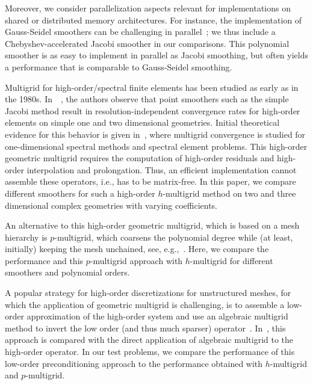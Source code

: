 \documentclass[smallcondensed,final]{svjour3}     %
\begin{document}
Moreover, we consider parallelization aspects relevant for
implementations on shared or distributed memory architectures. For
instance, the implementation of Gauss-Seidel smoothers can be
challenging in parallel~\cite{AdamsBrezinaHuEtAl03,
  BakerFalgoutKolevEtAl11}; we thus include a Chebyshev-accelerated
Jacobi smoother in our comparisons. This polynomial smoother is as
easy to implement in parallel as Jacobi smoothing, but often yields a
performance that is comparable to Gauss-Seidel smoothing.


Multigrid for high-order/spectral finite elements has been studied as
early as in the 1980s. In~~\cite{RonquistPatera87}, the authors
observe that point smoothers such as the simple Jacobi method result
in resolution-independent convergence rates for high-order elements on
simple one and two dimensional geometries. Initial theoretical
evidence for this behavior is given in~\cite{MadayMunoz88}, where
multigrid convergence is studied for one-dimensional spectral methods
and spectral element problems. This high-order geometric multigrid
requires the computation of high-order residuals and high-order
interpolation and prolongation. Thus, an efficient implementation
cannot assemble these operators, i.e., has to be matrix-free.  In this
paper, we compare different smoothers for such a high-order
$h$-multigrid method on two and three dimensional complex geometries
with varying coefficients.

An alternative to this high-order geometric multigrid, which is based
on a mesh hierarchy is $p$-multigrid, which coarsens the polynomial
degree while (at least, initially) keeping the mesh unchained, see,
e.g.,~\cite{HelenbrookMavriplisAtkins03}. Here, we compare the
performance and this $p$-multigrid approach with $h$-multigrid for
different smoothers and polynomial orders.


A popular strategy for high-order discretizations for unstructured
meshes, for which the application of geometric multigrid is
challenging, is to assemble a low-order approximation of the
high-order system and use an algebraic multigrid method to invert the
low order (and thus much sparser) operator~\cite{Brown10, Kim07,
  DevilleMund90, Olson07,
  CanutoGervasioQuarteroni10}. In~\cite{HeysManteuffelMcCormickEtAl05},
this approach is compared with the direct application of algebraic
multigrid to the high-order operator. In our test problems, we compare
the performance of this low-order preconditioning approach to the
performance obtained with $h$-multigrid and $p$-multigrid.
\end{document}
